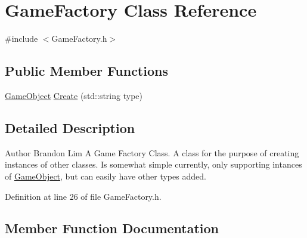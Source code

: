 \hypertarget{class_game_factory}{}\section{Game\+Factory Class Reference}
\label{class_game_factory}


{\ttfamily \#include $<$Game\+Factory.\+h$>$}

\subsection*{Public Member Functions}
\begin{DoxyCompactItemize}
\item 
\hyperlink{class_game_object}{Game\+Object} \hyperlink{class_game_factory_a521e395ba37dc392efde6bf98d0d3842}{Create} (std\+::string type)
\end{DoxyCompactItemize}


\subsection{Detailed Description}
\begin{DoxyAuthor}{Author}
Brandon Lim A Game Factory Class. A class for the purpose of creating instances of other classes. Is somewhat simple currently, only supporting intances of \hyperlink{class_game_object}{Game\+Object}, but can easily have other types added. 
\end{DoxyAuthor}


Definition at line 26 of file Game\+Factory.\+h.



\subsection{Member Function Documentation}
\hypertarget{class_game_factory_a521e395ba37dc392efde6bf98d0d3842}{}
